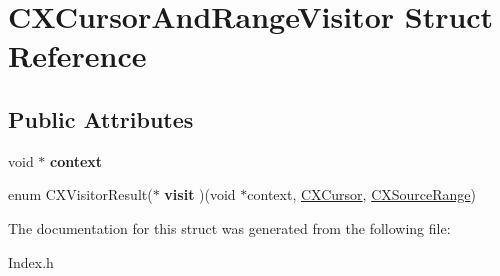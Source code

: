 \hypertarget{structCXCursorAndRangeVisitor}{}\section{C\+X\+Cursor\+And\+Range\+Visitor Struct Reference}
\label{structCXCursorAndRangeVisitor}
\subsection*{Public Attributes}
\begin{DoxyCompactItemize}
\item 
\mbox{\label{structCXCursorAndRangeVisitor_a77672740568fafe10dc17ac680c02b25}} 
void $\ast$ {\bfseries context}
\item 
\mbox{\label{structCXCursorAndRangeVisitor_a57a7d020d5f7aff64a0bdc237c8ae526}} 
enum C\+X\+Visitor\+Result($\ast$ {\bfseries visit} )(void $\ast$context, \hyperlink{structCXCursor}{C\+X\+Cursor}, \hyperlink{structCXSourceRange}{C\+X\+Source\+Range})
\end{DoxyCompactItemize}


The documentation for this struct was generated from the following file\+:\begin{DoxyCompactItemize}
\item 
Index.\+h\end{DoxyCompactItemize}
